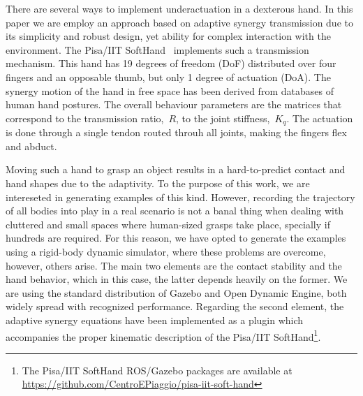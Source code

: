 
There are several ways to implement underactuation in a dexterous hand. In this paper we are employ an approach based on adaptive synergy transmission due to its simplicity and robust design, yet ability for complex interaction with the environment. The Pisa/IIT SoftHand~\cite{Catalano2014Adaptive} implements such a transmission mechanism. This hand has 19 degrees of freedom (DoF) distributed over four fingers and an opposable thumb, but only 1 degree of actuation (DoA). The synergy motion of the hand in free space has been derived from databases of human hand postures. The overall behaviour parameters are the matrices that correspond to the transmission ratio,~$R$, to the joint stiffness,~$K_q$. The actuation is done through a single tendon routed throuh all joints, making the fingers flex and abduct.


Moving such a hand to grasp an object results in a hard-to-predict contact and hand shapes due to the adaptivity. To the purpose of this work, we are intereseted in generating examples of this kind. However, recording the trajectory of all bodies into play in a real scenario is not a banal thing when dealing with cluttered and small spaces where human-sized grasps take place, specially if hundreds are required. For this reason, we have opted to generate the examples using a rigid-body dynamic simulator, where these problems are overcome, however, others arise. The main two elements are the contact stability and the hand behavior, which in this case, the latter depends heavily on the former. We are using the standard distribution of Gazebo and Open Dynamic Engine, both widely spread with recognized performance.
Regarding the second element, the adaptive synergy equations have been implemented as a plugin which accompanies the proper kinematic description of the Pisa/IIT SoftHand\footnote{The Pisa/IIT SoftHand ROS/Gazebo packages are available at \url{https://github.com/CentroEPiaggio/pisa-iit-soft-hand}}.

